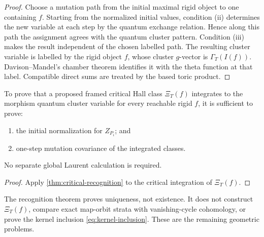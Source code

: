 \begin{proof}
Choose a mutation path from the initial maximal rigid object to one containing
$f$.  Starting from the normalized initial values, condition (ii) determines
the new variable at each step by the quantum exchange relation.  Hence along
this path the assignment agrees with the quantum cluster pattern.  Condition
(iii) makes the result independent of the chosen labelled path.  The resulting
cluster variable is labelled by the rigid object $f$, whose cluster $g$-vector
is $\Gamma_T(I(f))$.  Davison--Mandel's chamber theorem identifies it with the
theta function at that label.  Compatible direct sums are treated by the
based toric product.
\end{proof}

\begin{corollary}
\label{cor:critical-reduction}
To prove that a proposed framed critical Hall class $\Xi_T(f)$ integrates to
the morphism quantum cluster variable for every reachable rigid $f$, it is
sufficient to prove:
\begin{enumerate}[label=(\roman*),leftmargin=2.3em]
\item the initial normalization for $Z_{P_i}$; and
\item one-step mutation covariance of the integrated classes.
\end{enumerate}
No separate global Laurent calculation is required.
\end{corollary}

\begin{proof}
Apply \cref{thm:critical-recognition} to the critical integration of
$\Xi_T(f)$.
\end{proof}

\begin{remark}
The recognition theorem proves uniqueness, not existence.  It does not
construct $\Xi_T(f)$, compare exact map-orbit strata with vanishing-cycle
cohomology, or prove the kernel inclusion
\cref{eq:kernel-inclusion}.  These are the remaining geometric problems.
\end{remark}
